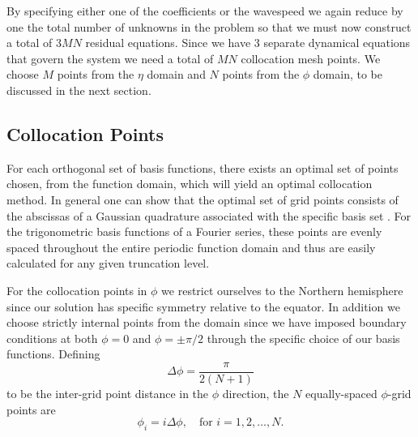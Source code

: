 By specifying either one of the coefficients or the wavespeed we again reduce by one the total number of unknowns in the problem so that we must now construct a total of $3MN$ residual equations. Since we have 3 separate dynamical equations that govern the system we need a total of $MN$ collocation mesh points. We choose $M$ points from the $\eta$ domain and $N$ points from the $\phi$ domain, to be discussed in the next section.

\subsection{Collocation Points}
For each orthogonal set of basis functions, there exists an optimal set of points chosen, from the function domain, which will yield an optimal collocation method. In general one can show that the optimal set of grid points consists of the abscissas of a Gaussian quadrature associated with the specific basis set \cite[page 88]{Boyd:CFSM}. For the trigonometric basis functions of a Fourier series, these points are evenly spaced throughout the entire periodic function domain and thus are easily calculated for any given truncation level.

For the collocation points in $\phi$ we restrict ourselves to the Northern hemisphere since our solution has specific symmetry relative to the equator. In addition we choose strictly internal points from the domain since we have imposed boundary conditions at both $\phi=0$ and $\phi=\pm \pi/2$ through the specific choice of our basis functions. Defining 
\begin{equation}
\Delta \phi = \frac{\pi}{2(N+1)} \label{eq:delphi}
\end{equation}
to be the inter-grid point distance in the $\phi$ direction, the $N$ equally-spaced $\phi$-grid points are
\begin{equation}
\phi_i = i \Delta \phi, \quad \text{for } i=1,2,\ldots,N. \label{phigrid}
\end{equation}

